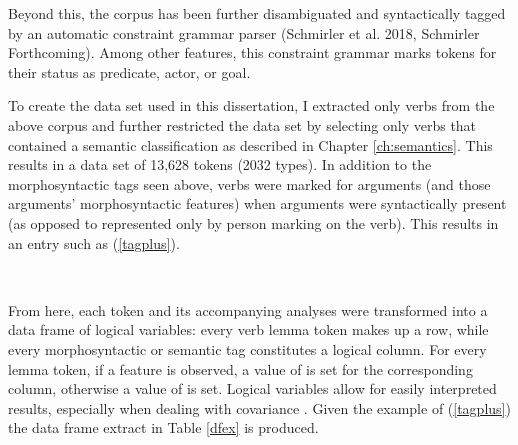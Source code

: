 Beyond this, the corpus has been further disambiguated and syntactically tagged by an automatic constraint grammar parser (Schmirler et al. 2018, Schmirler Forthcoming). Among other features, this constraint grammar marks tokens for their status as predicate, actor, or goal. 

To create the data set used in this dissertation, I extracted only verbs from the above corpus and further restricted the data set by selecting only verbs that contained a semantic classification as described in Chapter \ref{ch:semantics}. This results in a data set of 13,628 tokens (2032 types). In addition to the morphosyntactic tags seen above, verbs were marked for arguments (and those arguments' morphosyntactic features) when arguments were syntactically present (as opposed to represented only by person marking on the verb). This results in an entry such as (\ref{tagplus}). 

\begin{exe}
\ex
{} \\
\label{tagplus}
\end{exe}

From here, each token and its accompanying analyses were transformed into a data frame of logical variables: every verb lemma token makes up a row, while every morphosyntactic or semantic tag constitutes a logical column. For every lemma token, if a feature is observed, a value of  is set for the corresponding column, otherwise a value of  is set. Logical variables allow for easily interpreted results, especially when dealing with covariance \citep{baayen2012mixed}. Given the example of (\ref{tagplus}) the data frame extract in Table \ref{dfex} is produced.



\begin{table}
\centering
{}
\caption{Extract from Data Frame \label{dfex}
}
\end{table}

